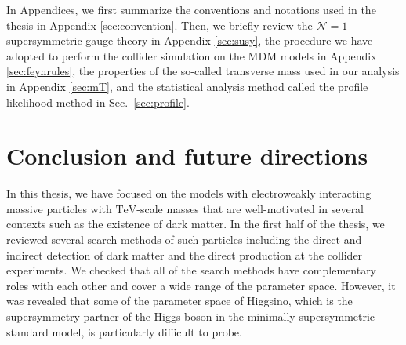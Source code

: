 \documentclass[12pt,twoside,book]{article}
\begin{document}
In Appendices, we first summarize the conventions and notations used in the thesis in Appendix \ref{sec:convention}.
Then, we briefly review the $\mathcal{N}=1$ supersymmetric gauge theory in Appendix \ref{sec:susy}, the procedure we have adopted to perform the collider simulation on the MDM models in Appendix \ref{sec:feynrules}, the properties of the so-called transverse mass used in our analysis in Appendix \ref{sec:mT}, and the statistical analysis method called the profile likelihood method in Sec.~\ref{sec:profile}.

\clearpage



\clearpage



\clearpage



\clearpage



\clearpage


\section[Conclusion and future directions]{Conclusion and future directions}
\setcounter{equation}{0}
\label{sec:conclusion}

\vskip 0.1in

In this thesis, we have focused on the models with electroweakly interacting massive particles with $\mathrm{TeV}$-scale masses that are well-motivated in several contexts such as the existence of dark matter.
In the first half of the thesis, we reviewed several search methods of such particles including the direct and indirect detection of dark matter and the direct production at the collider experiments.
We checked that all of the search methods have complementary roles with each other and cover a wide range of the parameter space.
However, it was revealed that some of the parameter space of Higgsino, which is the supersymmetry partner of the Higgs boson in the minimally supersymmetric standard model, is particularly difficult to probe.
\end{document}
